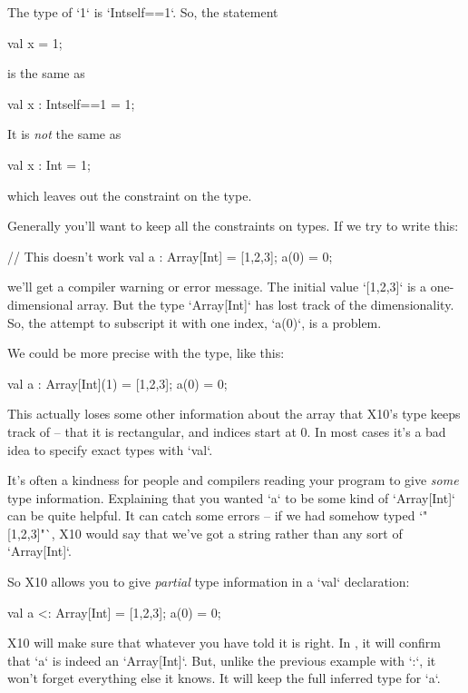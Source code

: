 The type of \xcd`1` is \xcd`Int{self==1}`.  So, the statement
\begin{xten}
val x = 1;
\end{xten}
is the same as 
\begin{xten}
val x : Int{self==1} = 1;
\end{xten}

It is {\em not} the same as 
\begin{xten}
val x : Int = 1;
\end{xten}
which leaves out the constraint on the type.

Generally you'll want to keep all the constraints on types.  If we try to
write this: 
\begin{xten}
// This doesn't work 
val a : Array[Int] = [1,2,3];
a(0) = 0;
\end{xten}
we'll get a compiler warning or error message.  The initial value
\xcd`[1,2,3]` is a one-dimensional array.  But the type \xcd`Array[Int]` has
lost track of the dimensionality.  So, the attempt to subscript it with one
index, \xcd`a(0)`, is a problem.

We could be more precise with the type, like this: 
\begin{xtennum}[]
val a : Array[Int](1) = [1,2,3];
a(0) = 0;
\end{xtennum}

This actually loses some other information about the array that X10's type
keeps track of -- that it is rectangular, and indices start at 0.  In most
cases it's a bad idea to specify exact types with \xcd`val`.  

It's often a kindness for people and compilers reading your program to give
{\em some} type information.  Explaining that you wanted \xcd`a` to be some
kind of \xcd`Array[Int]` can be quite helpful.  It can catch some errors -- if
we had somehow typed \xcd`"[1,2,3]"`, X10 would say that we've got a string
rather than any sort of \xcd`Array[Int]`.  

So X10 allows you to give {\em partial} type information in a \xcd`val`
declaration: 
\begin{xtennum}[]
val a <: Array[Int] = [1,2,3]; 
a(0) = 0;
\end{xtennum}
X10 will make sure that whatever you have told it is right.  In
, it will confirm that \xcd`a` is indeed an
\xcd`Array[Int]`.  But, unlike the previous example with \xcd`:`, it won't
forget everything else it knows.  It will keep the full inferred type for
\xcd`a`.  

